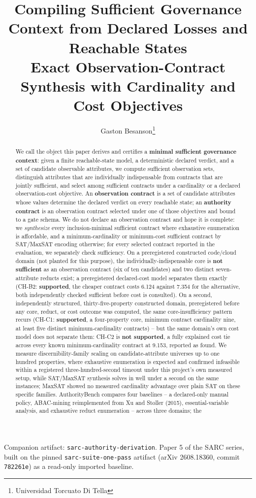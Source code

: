 \documentclass[11pt,a4paper]{article}
\title{Compiling Sufficient Governance Context from Declared Losses and Reachable States\\[0.3em]\large Exact Observation-Contract Synthesis with Cardinality and Cost Objectives}
\author{Gaston Besanson\thanks{Universidad Torcuato Di Tella}}
\date{}
\theoremstyle{definition}
\begin{document}
\maketitle

\noindent Companion artifact: \texttt{sarc-authority-derivation}. Paper 5 of the SARC series, built on the pinned \texttt{sarc-suite-one-pass} artifact (arXiv 2608.18360, commit \texttt{782261e}) as a read-only imported baseline.

\begin{abstract}
We call the object this paper derives and certifies a \textbf{minimal sufficient governance context}: given a finite reachable-state model, a deterministic declared verdict, and a set of candidate observable attributes, we compute sufficient observation sets, distinguish attributes that are individually indispensable from contracts that are jointly sufficient, and select among sufficient contracts under a cardinality or a declared observation-cost objective. An \textbf{observation contract} is a set of candidate attributes whose values determine the declared verdict on every reachable state; an \textbf{authority contract} is an observation contract selected under one of those objectives and bound to a gate schema. We do not declare an observation contract and hope it is complete: we \emph{synthesize} every inclusion-minimal sufficient contract where exhaustive enumeration is affordable, and a minimum-cardinality or minimum-cost sufficient contract by SAT/MaxSAT encoding otherwise; for every selected contract reported in the evaluation, we separately check sufficiency. On a preregistered constructed code/cloud domain (not planted for this purpose), the individually-indispensable core is \textbf{not sufficient} as an observation contract (six of ten candidates) and two distinct seven-attribute reducts exist; a preregistered declared-cost model separates them exactly (CH-B2: \textbf{supported}, the cheaper contract costs 6.124 against 7.354 for the alternative, both independently checked sufficient before cost is consulted). On a second, independently structured, thirty-five-property constructed domain, preregistered before any core, reduct, or cost outcome was computed, the same core-insufficiency pattern recurs (CH-C1: \textbf{supported}, a four-property core, minimum contract cardinality nine, at least five distinct minimum-cardinality contracts) -- but the same domain's own cost model does not separate them: CH-C2 is \textbf{not supported}, a fully explained cost tie across every known minimum-cardinality contract at 9.153, reported as found. We measure discernibility-family scaling on candidate-attribute universes up to one hundred properties, where exhaustive enumeration is expected and confirmed infeasible within a registered three-hundred-second timeout under this project's own measured setup, while SAT/MaxSAT synthesis solves in well under a second on the same instances; MaxSAT showed no measured cardinality advantage over plain SAT on these specific families. AuthorityBench compares four baselines -- a declared-only manual policy, ABAC-mining reimplemented from Xu and Stoller (2015), essential-variable analysis, and exhaustive reduct enumeration -- across three domains; the 
\end{abstract}
\end{document}
